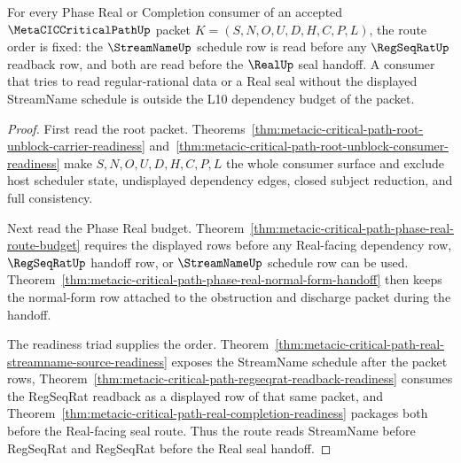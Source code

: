 \begin{theorem}
\label{thm:metacic-critical-path-streamname-regseqrat-route-order}
For every Phase Real or Completion consumer of an accepted $\MetaCICCriticalPathUp$ packet $K=(S,N,O,U,D,H,C,P,L)$, the route order is fixed: the $\StreamNameUp$ schedule row is read before any $\RegSeqRatUp$ readback row, and both are read before the $\RealUp$ seal handoff. A consumer that tries to read regular-rational data or a Real seal without the displayed StreamName schedule is outside the L10 dependency budget of the packet.
\end{theorem}
\begin{proof}
First read the root packet. Theorems~\ref{thm:metacic-critical-path-root-unblock-carrier-readiness} and~\ref{thm:metacic-critical-path-root-unblock-consumer-readiness} make $S,N,O,U,D,H,C,P,L$ the whole consumer surface and exclude host scheduler state, undisplayed dependency edges, closed subject reduction, and full consistency.

Next read the Phase Real budget. Theorem~\ref{thm:metacic-critical-path-phase-real-route-budget} requires the displayed rows before any Real-facing dependency row, $\RegSeqRatUp$ handoff row, or $\StreamNameUp$ schedule row can be used. Theorem~\ref{thm:metacic-critical-path-phase-real-normal-form-handoff} then keeps the normal-form row attached to the obstruction and discharge packet during the handoff.

The readiness triad supplies the order. Theorem~\ref{thm:metacic-critical-path-real-streamname-source-readiness} exposes the StreamName schedule after the packet rows, Theorem~\ref{thm:metacic-critical-path-regseqrat-readback-readiness} consumes the RegSeqRat readback as a displayed row of that same packet, and Theorem~\ref{thm:metacic-critical-path-real-completion-readiness} packages both before the Real-facing seal route. Thus the route reads StreamName before RegSeqRat and RegSeqRat before the Real seal handoff.
\end{proof}

